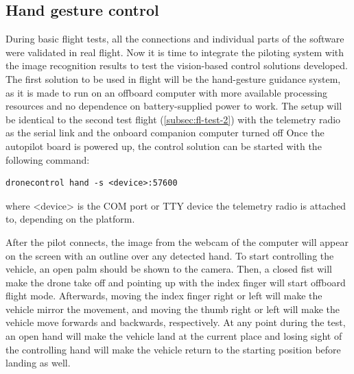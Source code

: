 \subsection{Hand gesture control}
\label{subsec:fl-test-4}


During basic flight tests, all the connections and individual parts of the software were validated in real flight.
Now it is time to integrate the piloting system with the image recognition results to test the vision-based control solutions developed.
The first solution to be used in flight will be the hand-gesture guidance system, as it is made to run on an offboard computer with more available processing resources and no dependence on battery-supplied power to work.
The setup will be identical to the second test flight (\ref{subsec:fl-test-2}) with the telemetry radio as the serial link and the onboard companion computer turned off
Once the autopilot board is powered up, the control solution can be started with the following command:
\begin{verbatim}
dronecontrol hand -s <device>:57600
\end{verbatim}
where <device> is the COM port or TTY device the telemetry radio is attached to, depending on the platform.


After the pilot connects, the image from the webcam of the computer will appear on the screen with an outline over any detected hand.
To start controlling the vehicle, an open palm should be shown to the camera.
Then, a closed fist will make the drone take off and pointing up with the index finger will start offboard flight mode.
Afterwards, moving the index finger right or left will make the vehicle mirror the movement, 
and moving the thumb right or left will make the vehicle move forwards and backwards, respectively.
At any point during the test, an open hand will make the vehicle land at the current place and losing sight of the controlling hand will make the vehicle return to the starting position before landing as well.


